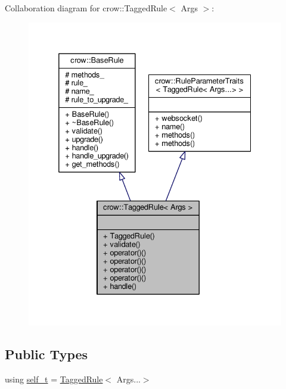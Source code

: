 Collaboration diagram for crow\-:\-:Tagged\-Rule$<$ Args $>$\-:
\nopagebreak
\begin{figure}[H]
\begin{center}
\leavevmode
\includegraphics[width=332pt]{classcrow_1_1_tagged_rule__coll__graph}
\end{center}
\end{figure}
\subsection*{Public Types}
\begin{DoxyCompactItemize}
\item 
using \hyperlink{classcrow_1_1_tagged_rule_aae5d1683e30a8d4e058666b7d12dea14}{self\-\_\-t} = \hyperlink{classcrow_1_1_tagged_rule}{Tagged\-Rule}$<$ Args...$>$
\end{DoxyCompactItemize}

